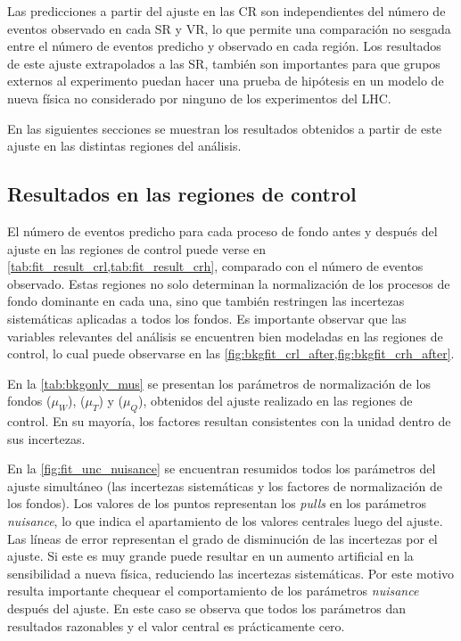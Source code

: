 Las predicciones a partir del ajuste en las CR son independientes del número de
eventos observado en cada SR y VR, lo que permite una comparación no sesgada
entre el número de eventos predicho y observado en cada región. Los resultados
de este ajuste extrapolados a las SR, también son importantes para que grupos
externos al experimento puedan hacer una prueba de hipótesis en un modelo de
nueva física no considerado por ninguno de los experimentos del LHC.

En las siguientes secciones se muestran los resultados obtenidos a partir
de este ajuste en las distintas regiones del análisis.


\subsection{Resultados en las regiones de control}

El número de eventos predicho para cada proceso de fondo antes y después del ajuste en
las regiones de control puede verse en \cref{tab:fit_result_crl,tab:fit_result_crh},
comparado con el número de eventos observado.
Estas regiones no solo determinan la normalización de los procesos de fondo dominante
en cada una, sino que también restringen las incertezas sistemáticas aplicadas a todos
los fondos. Es importante observar que las variables relevantes del análisis se encuentren
bien modeladas en las regiones de control, lo cual puede observarse en las \cref{fig:bkgfit_crl_after,fig:bkgfit_crh_after}.

En la \cref{tab:bkgonly_mus} se presentan los parámetros de normalización de
los fondos {\wgam} ($\mu_W$), {\ttgam} ($\mu_T$) y {\gjet}
($\mu_Q$), obtenidos del ajuste realizado en las regiones de control.
En su mayoría, los factores resultan consistentes con la unidad dentro de sus incertezas.

En la \cref{fig:fit_unc_nuisance} se encuentran resumidos todos los parámetros
del ajuste simultáneo (las incertezas sistemáticas y los factores de
normalización de los fondos). Los valores de los puntos representan los
\emph{pulls} en los parámetros \emph{nuisance}, lo que indica el apartamiento de los valores
centrales luego del ajuste. Las líneas de error representan el
 grado de disminución de las incertezas por el
ajuste. Si este es muy grande puede resultar en un aumento artificial
en la sensibilidad a nueva física, reduciendo las incertezas sistemáticas.
Por este motivo resulta importante
chequear el comportamiento de los parámetros \emph{nuisance} después del ajuste.
En este caso se observa que todos los parámetros dan resultados razonables
y el valor central es prácticamente cero.

